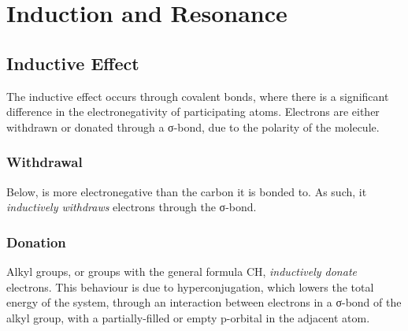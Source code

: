 


\pagebreak
\section{Induction and Resonance}

\subsection{Inductive Effect}

	The inductive effect occurs through covalent bonds, where there is a significant difference in the electronegativity of
	participating atoms. Electrons are either withdrawn or donated through a σ-bond, due to the polarity of the molecule.

	\subsubsection{Withdrawal}

		Below, \ce{\chlorine} is more electronegative than the carbon it is bonded to. As such, it
		\textit{inductively withdraws} electrons through the σ-bond.




	\subsubsection{Donation}

		Alkyl groups, or groups with the general formula CH, \textit{inductively donate} electrons. This behaviour
		is due to hyperconjugation, which lowers the total energy of the system, through an interaction between electrons in a
		σ-bond of the alkyl group, with a partially-filled or empty p-orbital in the adjacent atom.






